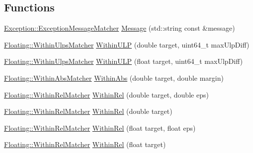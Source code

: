 \subsection*{Functions}
\begin{DoxyCompactItemize}
\item 
\mbox{\hyperlink{class_catch_1_1_matchers_1_1_exception_1_1_exception_message_matcher}{Exception\+::\+Exception\+Message\+Matcher}} \mbox{\hyperlink{namespace_catch_1_1_matchers_a0fcd8bd126bb510a6bb99e6360aa270a}{Message}} (std\+::string const \&message)
\item 
\mbox{\hyperlink{struct_catch_1_1_matchers_1_1_floating_1_1_within_ulps_matcher}{Floating\+::\+Within\+Ulps\+Matcher}} \mbox{\hyperlink{namespace_catch_1_1_matchers_ae77e233c3ed735ea12b7c726153798d1}{Within\+U\+LP}} (double target, uint64\+\_\+t max\+Ulp\+Diff)
\item 
\mbox{\hyperlink{struct_catch_1_1_matchers_1_1_floating_1_1_within_ulps_matcher}{Floating\+::\+Within\+Ulps\+Matcher}} \mbox{\hyperlink{namespace_catch_1_1_matchers_a5d108ff6aaeac40f20f4978dfb3f51fc}{Within\+U\+LP}} (float target, uint64\+\_\+t max\+Ulp\+Diff)
\item 
\mbox{\hyperlink{struct_catch_1_1_matchers_1_1_floating_1_1_within_abs_matcher}{Floating\+::\+Within\+Abs\+Matcher}} \mbox{\hyperlink{namespace_catch_1_1_matchers_a4c9ea76d47d02de0cf2d354c87c26e95}{Within\+Abs}} (double target, double margin)
\item 
\mbox{\hyperlink{struct_catch_1_1_matchers_1_1_floating_1_1_within_rel_matcher}{Floating\+::\+Within\+Rel\+Matcher}} \mbox{\hyperlink{namespace_catch_1_1_matchers_a0c559d9cfda02a81941ad6933f4ca450}{Within\+Rel}} (double target, double eps)
\item 
\mbox{\hyperlink{struct_catch_1_1_matchers_1_1_floating_1_1_within_rel_matcher}{Floating\+::\+Within\+Rel\+Matcher}} \mbox{\hyperlink{namespace_catch_1_1_matchers_a46e2f1efab13b85e2cbe36958a27d518}{Within\+Rel}} (double target)
\item 
\mbox{\hyperlink{struct_catch_1_1_matchers_1_1_floating_1_1_within_rel_matcher}{Floating\+::\+Within\+Rel\+Matcher}} \mbox{\hyperlink{namespace_catch_1_1_matchers_a494b4c8c68ac883e29dc35da71a4cd72}{Within\+Rel}} (float target, float eps)
\item 
\mbox{\hyperlink{struct_catch_1_1_matchers_1_1_floating_1_1_within_rel_matcher}{Floating\+::\+Within\+Rel\+Matcher}} \mbox{\hyperlink{namespace_catch_1_1_matchers_a18cfb571dd191377674bad0cbb50078e}{Within\+Rel}} (float target)
\item 

\end{DoxyCompactItemize}
